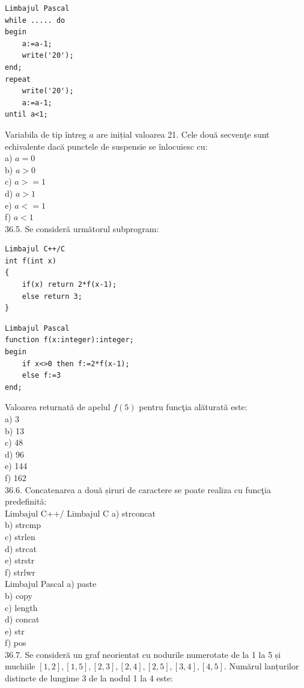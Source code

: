 \begin{itemize}
\begin{enumerate}
\begin{verbatim}
Limbajul Pascal
while ..... do
begin
    a:=a-1;
    write('20');
end;
repeat
    write('20');
    a:=a-1;
until a<1;
\end{verbatim}
Variabila de tip întreg $a$ are inițial valoarea 21. Cele două secvenţe sunt echivalente dacă punctele de suspensie se înlocuiesc cu:
\\
a) $a=0$
\\
b) $a>0$
\\
c) $a>=1$
\\
d) $a>1$
\\
e) $a<=1$
\\
f) $a<1$
\\
36.5. Se consideră următorul subprogram:
\begin{verbatim}
Limbajul C++/C
int f(int x)
{
    if(x) return 2*f(x-1);
    else return 3;
}
\end{verbatim}
\begin{verbatim}
Limbajul Pascal
function f(x:integer):integer;
begin
    if x<>0 then f:=2*f(x-1);
    else f:=3
end;
\end{verbatim}
Valoarea returnată de apelul $f(5)$ pentru funcţia alăturată este:
\\
a) 3
\\
b) 13
\\
c) 48
\\
d) 96
\\
e) 144
\\
f) 162
\\
36.6. Concatenarea a două șiruri de caractere se poate realiza cu funcţia predefinită:
\\
Limbajul C++/ Limbajul C
a) strconcat
\\
b) strcmp
\\
c) strlen
\\
d) strcat
\\
e) strstr
\\
f) strlwr
\\
Limbajul Pascal
a) paste
\\
b) copy
\\
c) length
\\
d) concat
\\
e) str
\\
f) pos
\\
36.7. Se consideră un graf neorientat cu nodurile numerotate de la 1 la 5 și muchiile $[1,2],[1,5],[2,3],[2,4],[2,5],[3,4],[4,5]$. Numărul lanțurilor distincte de lungime 3 de la nodul 1 la 4 este:
\\

\end{enumerate}
\end{itemize}
